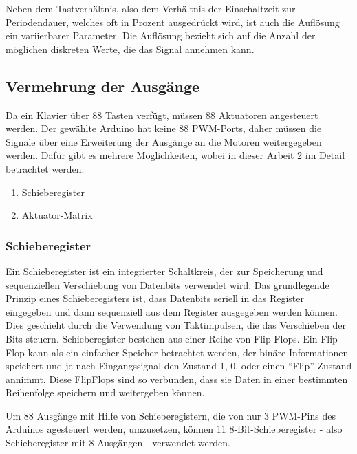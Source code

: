 Neben dem Tastverhältnis, also dem Verhältnis der Einschaltzeit zur Periodendauer, welches oft in Prozent ausgedrückt wird, ist auch die Auflösung ein variierbarer Parameter.
Die Auflösung bezieht sich auf die Anzahl der möglichen diskreten Werte, die das Signal annehmen kann.


\subsection{Vermehrung der Ausgänge}\label{output}
Da ein Klavier über 88 Tasten verfügt, müssen 88 Aktuatoren angesteuert werden. Der gewählte Arduino hat keine 88 \ac{PWM}-Ports, daher
müssen die Signale über eine Erweiterung der Ausgänge an die Motoren weitergegeben werden. Dafür gibt es mehrere Möglichkeiten,
wobei in dieser Arbeit 2 im Detail betrachtet werden:

\begin{enumerate}
	\item Schieberegister
	\item Aktuator-Matrix
\end{enumerate}


\subsubsection{Schieberegister}
Ein Schieberegister ist ein integrierter Schaltkreis, der zur Speicherung und sequenziellen Verschiebung von
Datenbits verwendet wird.\newline
Das grundlegende Prinzip eines Schieberegisters ist, dass Datenbits seriell in das Register eingegeben und dann
sequenziell aus dem Register ausgegeben werden können.
Dies geschieht durch die Verwendung von Taktimpulsen, die das Verschieben der Bits steuern.\newline
Schieberegister bestehen aus einer Reihe von Flip-Flops.
Ein Flip-Flop kann als ein einfacher Speicher betrachtet werden, der binäre Informationen speichert und je nach
Eingangssignal den Zustand 1, 0, oder einen \enquote{Flip}-Zustand annimmt.
Diese FlipFlops sind so verbunden, dass sie Daten in einer bestimmten Reihenfolge speichern und weitergeben können.

Um 88 Ausgänge mit Hilfe von Schieberegistern, die von nur 3 \ac{PWM}-Pins des Arduinos agesteuert werden, umzusetzen,
können 11 8-Bit-Schieberegister  - also Schieberegister mit 8 Ausgängen - verwendet werden.

